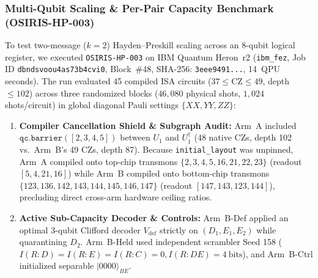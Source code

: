 \documentclass[aps,preprint,superscriptaddress,longbibliography]{revtex4-2}
\begin{document}
\subsubsection{Multi-Qubit Scaling \& Per-Pair Capacity Benchmark (OSIRIS-HP-003)}
\label{sec:hp_multiqubit}

To test two-message ($k=2$) Hayden--Preskill scaling across an 8-qubit logical register, we executed \texttt{OSIRIS-HP-003} on IBM Quantum Heron~r2 (\texttt{ibm\_fez}, Job ID \texttt{dbndsvoou4as73b4cvi0}, Block~\#48, SHA-256: \texttt{3eee9491...}, 14~QPU seconds). The run evaluated 45 compiled ISA circuits ($37 \le \text{CZ} \le 49$, depth $\le 102$) across three randomized blocks ($46{,}080$ physical shots, $1{,}024$ shots/circuit) in global diagonal Pauli settings $\{XX, YY, ZZ\}$:
\begin{enumerate}
\item \textbf{Compiler Cancellation Shield \& Subgraph Audit:} Arm~A included $\texttt{qc.barrier}([2, 3, 4, 5])$ between $U_1$ and $U_1^\dagger$ (48 native CZs, depth 102 vs.\ Arm~B's 49 CZs, depth 87). Because \texttt{initial\_layout} was unpinned, Arm~A compiled onto top-chip transmons $\{2, 3, 4, 5, 16, 21, 22, 23\}$ (readout $[5, 4, 21, 16]$) while Arm~B compiled onto bottom-chip transmons $\{123, 136, 142, 143, 144, 145, 146, 147\}$ (readout $[147, 143, 123, 144]$), precluding direct cross-arm hardware ceiling ratios.
\item \textbf{Active Sub-Capacity Decoder \& Controls:} Arm~B-Def applied an optimal 3-qubit Clifford decoder $V_{\mathrm{def}}$ strictly on $(D_1, E_1, E_2)$ while quarantining $D_2$. Arm~B-Held used independent scrambler Seed 158 ($I(R:D)=I(R:E)=I(R:C)=0, I(R:DE)=4\ \text{bits}$), and Arm~B-Ctrl initialized separable $|0000\rangle_{BE}$.
\end{enumerate}
\end{document}
